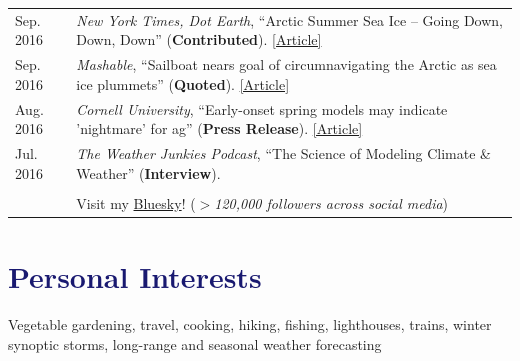 \documentclass[margin,line,palatino,courier,10pt]{res}
\begin{document}
\begin{resume}
\begin{tabular}{@{}p{0.9in}p{4in}}
Sep. 2016 & \textit{New York Times, Dot Earth}, ``Arctic Summer Sea Ice -- Going Down, Down, Down'' (\textbf{Contributed}). \href{http://dotearth.blogs.nytimes.com/2016/09/16/arctic-summer-sea-ice-going-down-down-down/?module=BlogPost-ReadMore&version=Blog\%20Main&action=Click&contentCollection=arctic&pgtype=Blogs&region=Body&_r=1#more-58318}{[Article]}\\
Sep. 2016 & \textit{Mashable}, ``Sailboat nears goal of circumnavigating the Arctic as sea ice plummets'' (\textbf{Quoted}). \href{http://mashable.com/2016/09/01/sailboat-arctic-ice-melt-open-water/#s7nzft8m6sqB}{[Article]}\\
Aug. 2016 & \textit{Cornell University}, ``Early-onset spring models may indicate 'nightmare' for ag'' (\textbf{Press Release}). \href{http://www.news.cornell.edu/stories/2016/08/early-onset-spring-models-may-indicate-nightmare-ag}{[Article]}\\
Jul. 2016 & \textit{The Weather Junkies Podcast}, ``The Science of Modeling Climate \& Weather'' (\textbf{Interview}). \\\\

& Visit my \href{https://bsky.app/profile/zlabe.bsky.social}{Bluesky}! (\textit{$>$120,000 followers across social media})\\
\end{tabular}

\vspace{-0.1in}
\noindent\textcolor{MidnightBlue}{\makebox[\linewidth][r]{\rule{\textwidth}{5pt}}}
\vspace{-0.3in}
\section{\sc \textcolor{MidnightBlue}{\large{\textbf{Personal Interests}}}}
Vegetable gardening, travel, cooking, hiking, fishing, lighthouses, trains, winter synoptic storms, long-range and seasonal weather forecasting

\end{resume}
\end{document}
